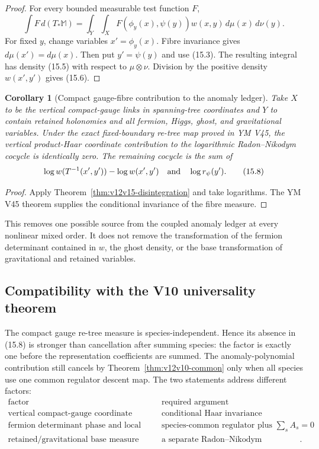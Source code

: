 \documentclass[11pt]{article}
\newtheorem{corollary}[theorem]{Corollary}
\theoremstyle{remark}
\begin{document}
\begin{proof}
For every bounded measurable test function \(F\),
\[
 \int F\,d(T_*{\mathbb M})
 =
 \int_Y\int_X
 F(\phi_y(x),\psi(y))w(x,y)\,d\mu(x)\,d\nu(y).              \tag{15.7}
\]
For fixed \(y\), change variables \(x'=\phi_y(x)\).  Fibre invariance
gives \(d\mu(x')=d\mu(x)\).  Then put \(y'=\psi(y)\) and use (15.3).
The resulting integral has density (15.5) with respect to
\(\mu\otimes\nu\).  Division by the positive density \(w(x',y')\)
gives (15.6).
\end{proof}

\begin{corollary}[Compact gauge-fibre contribution to the anomaly
ledger]
\label{cor:v12v15-gauge-ledger}
Take \(X\) to be the vertical compact-gauge links in spanning-tree
coordinates and \(Y\) to contain retained holonomies and all
fermion, Higgs, ghost, and gravitational variables.  Under the exact
fixed-boundary re-tree map proved in YM V45, the vertical
product-Haar coordinate contribution to the logarithmic
Radon--Nikodym cocycle is identically zero.  The remaining cocycle is
the sum of
\[
 \log w(T^{-1}(x',y'))-\log w(x',y')
 \quad\hbox{and}\quad
 \log r_\psi(y').                                          \tag{15.8}
\]
\end{corollary}

\begin{proof}
Apply Theorem~\ref{thm:v12v15-disintegration} and take logarithms.
The YM V45 theorem supplies the conditional invariance of the fibre
measure.
\end{proof}

This removes one possible source from the coupled anomaly ledger at
every nonlinear mixed order.  It does not remove the transformation
of the fermion determinant contained in \(w\), the ghost density, or
the base transformation of gravitational and retained variables.

\subsection{Compatibility with the V10 universality theorem}

The compact gauge re-tree measure is species-independent.  Hence its
absence in (15.8) is stronger than cancellation after summing
species: the factor is exactly one before the representation
coefficients are summed.  The anomaly-polynomial contribution still
cancels by Theorem~\ref{thm:v12v10-common} only when all species use
one common regulator descent map.  The two statements address
different factors:
\[
\begin{array}{c|c}
\text{factor}&\text{required argument}\\ \hline
\text{vertical compact-gauge coordinate measure}&
\text{conditional Haar invariance}\\
\text{fermion determinant phase and local descent}&
\text{species-common regulator plus }\sum_sA_s=0\\
\text{retained/gravitational base measure}&
\text{a separate Radon--Nikodym calculation}.
\end{array}                                                   \tag{15.9}
\]
\end{document}
